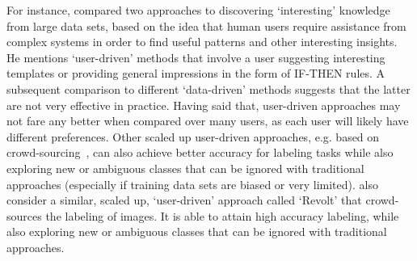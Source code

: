 For instance, \citet{Freitas2006-qo} compared two approaches to discovering `interesting' knowledge from large data sets, based on the idea that human users require assistance from complex systems in order to find useful patterns and other interesting insights. He mentions `user-driven' methods that involve a user suggesting interesting templates or providing general impressions in the form of IF-THEN rules. A subsequent comparison to different `data-driven' methods suggests that the latter are not very effective in practice. 
Having said that, user-driven approaches may not fare any better when compared over many users, as each user will likely have different preferences. Other scaled up user-driven approaches, e.g. based on crowd-sourcing~\citet{Chang2017-kl}, can also achieve better accuracy for labeling tasks while also exploring new or ambiguous classes that can be ignored with traditional approaches (especially if training data sets are biased or very limited). \citet{Chang2017-kl} also consider a similar, scaled up, `user-driven' approach called `Revolt' that crowd-sources the labeling of images. It is able to attain high accuracy labeling, while also exploring new or ambiguous classes that can be ignored with traditional approaches. 



